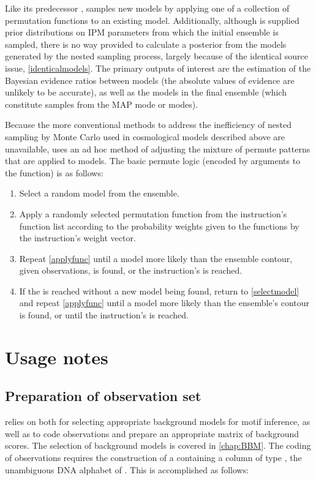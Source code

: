 Like its predecessor ,  samples new models by applying one of a collection of permutation functions to an existing model. Additionally, although  is supplied prior distributions on IPM parameters from which the initial ensemble is sampled, there is no way provided to calculate a posterior from the models generated by the nested sampling process, largely because of the identical source issue, \ref{identicalmodels}. The primary outputs of interest are the estimation of the Bayesian evidence ratios between models (the absolute values of evidence are unlikely to be accurate), as well as the models in the final ensemble (which constitute samples from the MAP mode or modes).

Because the more conventional methods to address the inefficiency of nested sampling by Monte Carlo used in cosmological models described above are unavailable,  uses an ad hoc method of adjusting the mixture of permute patterns that are applied to models. The basic permute logic (encoded by  arguments to the  function) is as follows:

\begin{enumerate}
    \item\label{selectmodel} Select a random  model from the ensemble.
    \item\label{applyfunc} Apply a randomly selected permutation function from the instruction's function list according to the probability weights given to the functions by the instruction's weight vector.
    \item Repeat \ref{applyfunc} until a model more likely than the ensemble contour, given observations, is found, or the instruction's  is reached.
    \item If the  is reached without a new model being found, return to \ref{selectmodel} and repeat \ref{applyfunc} until a model more likely than the ensemble's contour is found, or until the instruction's  is reached.
\end{enumerate}

\section{Usage notes}
\subsection{Preparation of observation set}
 relies on  both for selecting appropriate background models for motif inference, as well as to code observations and prepare an appropriate matrix of background scores. The selection of background models is covered in \autoref{chap:BBM}. The coding of observations requires the construction of a  containing a column of type , the unambiguous DNA alphabet of . This is accomplished as follows:


